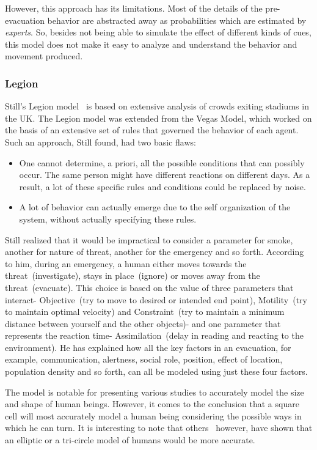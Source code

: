 However, this approach has its limitations. Most of the details of the pre-evacuation behavior are abstracted away as probabilities which are estimated by \emph{experts}. So, besides not being able to simulate the effect of different kinds of cues, this model does not make it easy to analyze and understand the behavior and movement produced.

\subsubsection{Legion}

Still's Legion model~\cite{Still:2000tp} is based on extensive analysis of crowds exiting stadiums in the UK. The Legion model was extended from the Vegas Model, which worked on the basis of an extensive set of rules that governed the behavior of each agent. Such an approach, Still found, had two basic flaws:
\begin{itemize}
\item One cannot determine, a priori, all the possible conditions that can possibly occur. The same person might have different reactions on different days. As a result, a lot of these specific rules and conditions could be replaced by noise.
\item A lot of behavior can actually emerge due to the self organization of the system, without actually specifying these rules.
\end{itemize}
Still realized that it would be impractical to consider a parameter for smoke, another for nature of threat, another for the emergency and so forth. According to him, during an emergency, a human either moves towards the threat~(investigate), stays in place~(ignore) or moves away from the threat~(evacuate). This choice is based on the value of three parameters that interact- Objective~(try to move to desired or intended end point), Motility~(try to maintain optimal velocity) and Constraint~(try to maintain a minimum distance between yourself and the other objects)- and one parameter that represents the reaction time- Assimilation~(delay in reading and reacting to the environment). He has explained how all the key factors in an evacuation, for example, communication, alertness, social role, position, effect of location, population density and so forth, can all be modeled using just these four factors.

The model is notable for presenting various studies to accurately model the size and shape of human beings. However, it comes to the conclusion that a square cell will most accurately model a human being considering the possible ways in which he can turn. It is interesting to note that others~\cite{Thompson:1995tm,Langston:2006kw} however, have shown that an elliptic or a tri-circle model of humans would be more accurate.

